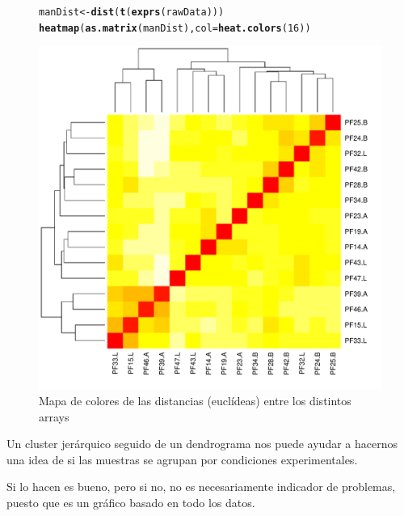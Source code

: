 \documentclass[a4paper]{article}\usepackage[]{graphicx}\usepackage[]{color}
\makeatletter
\def\maxwidth{ %
  \ifdim\Gin@nat@width>\linewidth
    \linewidth
  \else
    \Gin@nat@width
  \fi
}
\newcommand{\hlnum}[1]{\textcolor[rgb]{0.686,0.059,0.569}{#1}}%
\newcommand{\hlstd}[1]{\textcolor[rgb]{0.345,0.345,0.345}{#1}}%
\newcommand{\hlkwb}[1]{\textcolor[rgb]{0.69,0.353,0.396}{#1}}%
\newcommand{\hlkwc}[1]{\textcolor[rgb]{0.333,0.667,0.333}{#1}}%
\newcommand{\hlkwd}[1]{\textcolor[rgb]{0.737,0.353,0.396}{\textbf{#1}}}%
\newenvironment{kframe}{%
 \def\at@end@of@kframe{}%
 \ifinner\ifhmode%
  \def\at@end@of@kframe{\end{minipage}}%
  \begin{minipage}{\columnwidth}%
 \fi\fi%
 \def\FrameCommand##1{\hskip\@totalleftmargin \hskip-\fboxsep
 \colorbox{shadecolor}{##1}\hskip-\fboxsep
     \hskip-\linewidth \hskip-\@totalleftmargin \hskip\columnwidth}%
 \MakeFramed {\advance\hsize-\width
   \@totalleftmargin\z@ \linewidth\hsize
   \@setminipage}}%
 {\par\unskip\endMakeFramed%
 \at@end@of@kframe}
\newenvironment{knitrout}{}{} %
\makeatother
\begin{document}
\begin{figure}
\centering
\begin{knitrout}
\color{fgcolor}\begin{kframe}
\begin{alltt}
  \hlstd{manDist} \hlkwb{<-}  \hlkwd{dist}\hlstd{(}\hlkwd{t}\hlstd{(}\hlkwd{exprs}\hlstd{(rawData)))}
  \hlkwd{heatmap} \hlstd{(}\hlkwd{as.matrix}\hlstd{(manDist),}  \hlkwc{col}\hlstd{=}\hlkwd{heat.colors}\hlstd{(}\hlnum{16}\hlstd{))}
\end{alltt}
\end{kframe}
\includegraphics[width=\maxwidth]{images/graficdistAnalisis-1} 

\end{knitrout}
\caption{Mapa de colores de las distancias (euclídeas) entre los distintos arrays}
\label{fig:distArrays}
\end{figure}


Un cluster jerárquico seguido de un dendrograma nos puede ayudar a hacernos una idea de si las muestras se agrupan por condiciones experimentales. 

Si lo hacen es bueno, pero si no, no es necesariamente indicador de problemas, 
puesto que es un gráfico basado en todo los datos.
\end{document}
